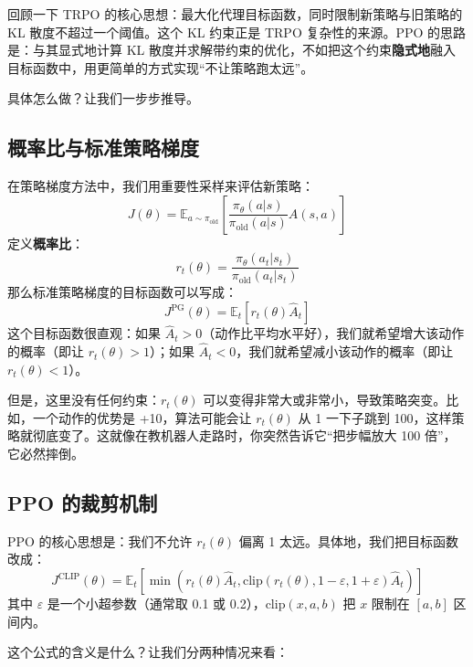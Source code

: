 \documentclass[lang=cn,zihao=-4,a4paper,fontset=windows]{beautybook}
\begin{document}
回顾一下 TRPO 的核心思想：最大化代理目标函数，同时限制新策略与旧策略的 KL 散度不超过一个阈值。这个 KL 约束正是 TRPO 复杂性的来源。PPO 的思路是：与其显式地计算 KL 散度并求解带约束的优化，不如把这个约束\textbf{隐式地}融入目标函数中，用更简单的方式实现“不让策略跑太远”。

具体怎么做？让我们一步步推导。

\subsection{概率比与标准策略梯度}

在策略梯度方法中，我们用重要性采样来评估新策略：
\[
J(\theta) = \mathbb{E}_{a \sim \pi_{\text{old}}} \left[ \frac{\pi_\theta(a|s)}{\pi_{\text{old}}(a|s)} A(s,a) \right]
\]
定义\textbf{概率比}：
\[
r_t(\theta) = \frac{\pi_\theta(a_t | s_t)}{\pi_{\text{old}}(a_t | s_t)}
\]
那么标准策略梯度的目标函数可以写成：
\[
J^{\text{PG}}(\theta) = \mathbb{E}_t \left[ r_t(\theta) \hat{A}_t \right]
\]
这个目标函数很直观：如果 \(\hat{A}_t > 0\)（动作比平均水平好），我们就希望增大该动作的概率（即让 \(r_t(\theta) > 1\)）；如果 \(\hat{A}_t < 0\)，我们就希望减小该动作的概率（即让 \(r_t(\theta) < 1\)）。

但是，这里没有任何约束：\(r_t(\theta)\) 可以变得非常大或非常小，导致策略突变。比如，一个动作的优势是 +10，算法可能会让 \(r_t(\theta)\) 从 1 一下子跳到 100，这样策略就彻底变了。这就像在教机器人走路时，你突然告诉它“把步幅放大 100 倍”，它必然摔倒。

\subsection{PPO 的裁剪机制}

PPO 的核心思想是：我们不允许 \(r_t(\theta)\) 偏离 1 太远。具体地，我们把目标函数改成：
\[
J^{\text{CLIP}}(\theta) = \mathbb{E}_t \left[ \min\left( r_t(\theta) \hat{A}_t, \text{clip}(r_t(\theta), 1-\varepsilon, 1+\varepsilon) \hat{A}_t \right) \right]
\]
其中 \(\varepsilon\) 是一个小超参数（通常取 0.1 或 0.2），\(\text{clip}(x, a, b)\) 把 \(x\) 限制在 \([a, b]\) 区间内。

这个公式的含义是什么？让我们分两种情况来看：
\end{document}
